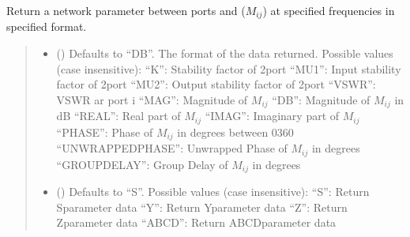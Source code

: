 \documentclass[letterpaper,10pt,english]{sphinxmanual}
\begin{document}
\begin{fulllineitems}
\begin{fulllineitems}
\label{\detokenize{touchstone:touchstone.spfile.data_array}}
\pysigstartsignatures
{}
\pysigstopsignatures
\sphinxAtStartPar
Return a network parameter between ports  and  (\(M_{i j}\)) at specified frequencies in specified format.
\begin{quote}\begin{description}
\begin{itemize}
\item {} 
\sphinxAtStartPar
{} (\sphinxstyleliteralemphasis{\sphinxupquote{, }}) \textendash{} Defaults to “DB”. The format of the data returned. Possible values (case insensitive):
\sphinxhyphen{}   “K”: Stability factor of 2\sphinxhyphen{}port
\sphinxhyphen{}   “MU1”: Input stability factor of 2\sphinxhyphen{}port
\sphinxhyphen{}   “MU2”: Output stability factor of 2\sphinxhyphen{}port
\sphinxhyphen{}   “VSWR”: VSWR ar port i
\sphinxhyphen{}   “MAG”: Magnitude of \(M_{i j}\)
\sphinxhyphen{}   “DB”: Magnitude of \(M_{i j}\) in dB
\sphinxhyphen{}   “REAL”: Real part of \(M_{i j}\)
\sphinxhyphen{}   “IMAG”: Imaginary part of \(M_{i j}\)
\sphinxhyphen{}   “PHASE”: Phase of \(M_{i j}\) in degrees between 0\sphinxhyphen{}360
\sphinxhyphen{}   “UNWRAPPEDPHASE”: Unwrapped Phase of \(M_{i j}\) in degrees
\sphinxhyphen{}   “GROUPDELAY”: Group Delay of \(M_{i j}\) in degrees

\item {} 
\sphinxAtStartPar
{} (\sphinxstyleliteralemphasis{\sphinxupquote{, }}) \textendash{} Defaults to “S”. Possible values (case insensitive):
\sphinxhyphen{}   “S”: Return S\sphinxhyphen{}parameter data
\sphinxhyphen{}   “Y”: Return Y\sphinxhyphen{}parameter data
\sphinxhyphen{}   “Z”: Return Z\sphinxhyphen{}parameter data
\sphinxhyphen{}   “ABCD”: Return ABCD\sphinxhyphen{}parameter data


\end{itemize}
\end{description}
\end{quote}
\end{fulllineitems}
\end{fulllineitems}
\end{document}

